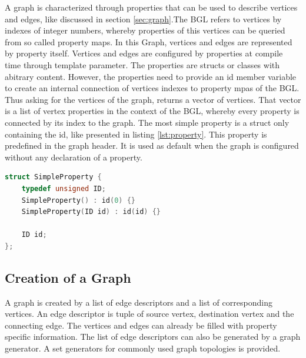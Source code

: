 A graph is characterized through properties that can be used to
describe vertices and edges, like discussed in section
\ref{sec:graph}.The BGL refers to vertices by indexes of integer
numbers, whereby properties of this vertices can be queried from so
called property maps.  In this Graph, vertices and edges are
represented by property itself. Vertices and edges are configured by
properties at compile time through template parameter.  The properties
are structs or classes with abitrary content. However, the properties
need to provide an id member variable to create an internal connection
of vertices indexes to property mpas of the BGL.  Thus asking for the
vertices of the graph, returns a vector of vertices. That vector is a
list of vertex properties in the context of the BGL, whereby every
property is connected by its index to the graph. The most simple
property is a struct only containing the id, like presented in listing
\ref{lst:property}. This property is predefined in the graph
header. It is used as default when the graph is configured without any
declaration of a property.

\begin{lstlisting}[language=C++, label=lst:property]
struct SimpleProperty {
    typedef unsigned ID;
    SimpleProperty() : id(0) {}
    SimpleProperty(ID id) : id(id) {}

    ID id;
};
\end{lstlisting}


\subsection{Creation of a Graph}
A graph is created by a list of edge descriptors and a list of
corresponding vertices. An edge descriptor is tuple of source vertex, destination
vertex and the connecting edge. The vertices and edges can already be
filled with property specific information.  The list of edge descriptors can
also be generated by a graph generator. A set generators for commonly used
graph topologies is provided.

